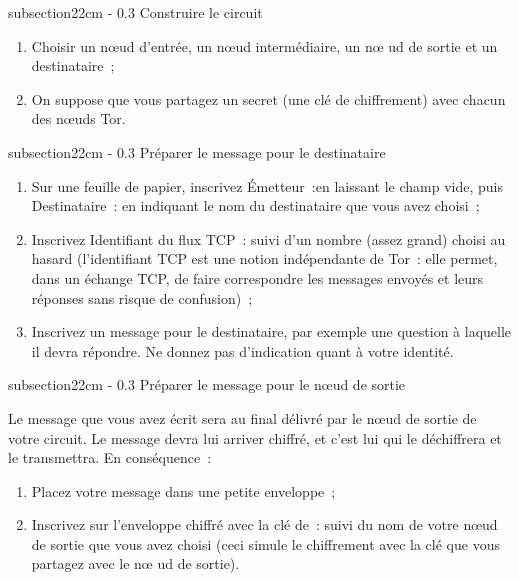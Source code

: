 \documentclass[a4paper,twoside,french]{article}
\makeatletter
\renewcommand\subsection{\@startsection
  {subsection}{2}{2cm}%
  {-\baselineskip}%
  {0.3\baselineskip}%
  {\normalfont\normalsize\itshape\bfseries}}%
\makeatother
\begin{document}
  \subsection{Construire le circuit}

  \begin{enumerate}
  \item Choisir un n\oe ud d'entrée, un n\oe ud intermédiaire, un n\oe
    ud de sortie et un destinataire~;
  \item On suppose que vous partagez un secret (une clé de
    chiffrement) avec chacun des n\oe uds Tor.
  \end{enumerate}

  \subsection{Préparer le message pour le destinataire}

  \begin{enumerate}
  \item Sur une feuille de papier, inscrivez \og Émetteur~:\fg en
    laissant le champ vide, puis \og Destinataire~: \fg en indiquant
    le nom du destinataire que vous avez choisi~;
  \item Inscrivez \og Identifiant du flux TCP~: \og suivi d'un nombre
    (assez grand) choisi au hasard (l'identifiant TCP est une notion
    indépendante de Tor~: elle permet, dans un échange TCP, de faire
    correspondre les messages envoyés et leurs réponses sans risque de
    confusion)~;
  \item Inscrivez un message pour le destinataire, par exemple une
    question à laquelle il devra répondre. Ne donnez pas d'indication
    quant à votre identité.
  \end{enumerate}

  \subsection{Préparer le message pour le n\oe ud de sortie}

  Le message que vous avez écrit sera au final délivré par le n\oe ud
  de sortie de votre circuit. Le message devra lui arriver chiffré,
  et c'est lui qui le déchiffrera et le transmettra. En conséquence~:
  \begin{enumerate}
  \item Placez votre message dans une petite enveloppe~;
  \item Inscrivez sur l'enveloppe \og chiffré avec la clé de~:\fg
    suivi du nom de votre n\oe ud de sortie que vous avez choisi (ceci
    simule le chiffrement avec la clé que vous partagez avec le n\oe
    ud de sortie).
  \end{enumerate}
\end{document}
